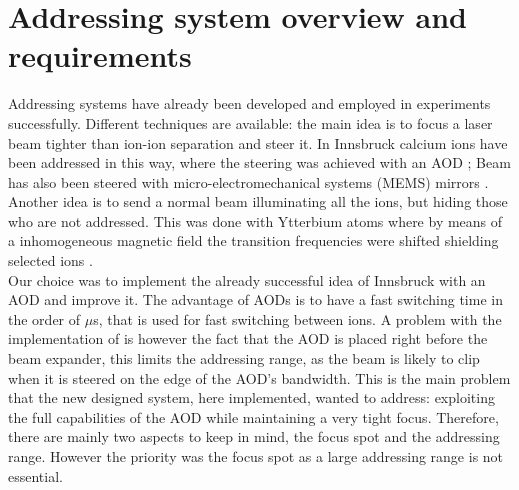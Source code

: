 \section{Addressing system overview and requirements}
Addressing systems have already been developed and employed in experiments successfully. Different techniques are available: the main idea is to focus a laser beam tighter than ion-ion separation and steer it. In  Innsbruck calcium ions have been addressed in this way, where the steering was achieved with an AOD \cite{addressing}; Beam has also been steered with micro-electromechanical systems (MEMS) mirrors \cite{addressing3}. Another idea is to send a normal beam illuminating all the ions, but hiding those who are not addressed. This was done with Ytterbium atoms where by means of a inhomogeneous magnetic field the transition frequencies were shifted shielding selected ions \cite{addressing2}. \\
Our choice was to implement the already successful idea of Innsbruck with an AOD and improve it. The advantage of AODs is to have a fast switching time in the order of $\mu$s, that is used for fast switching between ions. A problem with the implementation of \cite{addressing} is however the fact that the AOD is placed right before the beam expander, this limits the addressing range, as the beam is likely to clip when it is steered on the edge of the AOD's bandwidth. This is the main problem that the new designed system, here implemented, wanted to address: exploiting the full capabilities of the AOD while maintaining a very tight focus.
Therefore, there are mainly two aspects to keep in mind, the focus spot and the addressing range. However the priority was the focus spot as a large addressing range is not essential.\\
